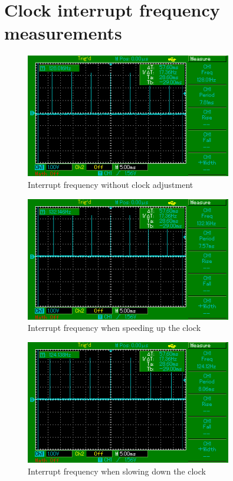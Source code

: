 \chapter{Clock interrupt frequency measurements}\label{app:interrupt-frequency}
\begin{figure}[h!]
  \centering
  \includegraphics[width=9cm,keepaspectratio]{fig/osc-no-adjust.png}
  \caption{Interrupt frequency without clock adjustment}
  \label{fig:measurements-osc-no-adjust}
  \bigskip
\end{figure}

\begin{figure}[h!]
  \centering
  \includegraphics[width=9cm,keepaspectratio]{fig/osc-speed-up.png}
  \caption{Interrupt frequency when speeding up the clock}
  \label{fig:measurements-osc-speed-up}
  \bigskip
\end{figure}

\begin{figure}[h!]
  \centering
  \includegraphics[width=9cm,keepaspectratio]{fig/osc-slow-down.png}
  \caption{Interrupt frequency when slowing down the clock}
  \label{fig:measurements-osc-slow-down}
  \bigskip
\end{figure}

